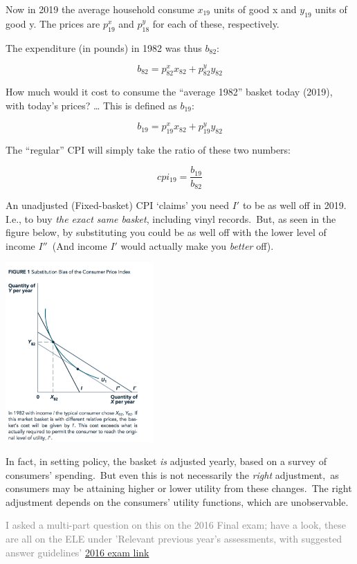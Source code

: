 \documentclass[]{article}
\begin{document}
Now in 2019 the average household consume \(x_{19}\) units of good x and
\(y_{19}\) units of good y. The prices are \(p^x_{19}\) and \(p^y_{18}\)
for each of these, respectively.

The expenditure (in pounds) in 1982 was thus \(b_{82}\):

\[b_{82}=p^x_{82}x_{82}+p^y_{82}y_{82}\]

How much would it cost to consume the ``average 1982'' basket today
(2019), with today's prices? \ldots{} This is defined as \(b_{19}\):

\[b_{19}=p^x_{19}x_{82}+p^y_{19}y_{82}\]

The ``regular'' CPI will simply take the ratio of these two numbers:

\[cpi_{19}=\frac{b_{19}}{b_{82}}\]

An unadjusted (Fixed-basket) CPI `claims' you need \(I'\) to be as well
off in 2019. I.e., to buy \emph{the exact same basket}, including vinyl
records.~But, as seen in the figure below, by substituting you could be
as well off with the lower level of income \(I''\)~(And income \(I'\)
would actually make you \emph{better} off).

\includegraphics[height=2.7in]{picsfigs/cpi_bias.png}

\bigskip

In fact, in setting policy, the basket \emph{is} adjusted yearly, based
on a survey of consumers' spending.~But even this is not necessarily the
\emph{right} adjustment,~as consumers may be attaining higher or lower
utility from these changes.~The right adjustment depends on the
consumers' utility functions, which are unobservable.

\textcolor{gray}{I asked a multi-part question on this on the 2016 Final exam; have a look, these are all on the ELE under 'Relevant previous year's assessments, with suggested answer guidelines'}
\href{https://www.dropbox.com/s/ppbb89yflsey7n7/be2024fix_wans_2016.pdf?dl=0}{2016
exam link}
\end{document}
